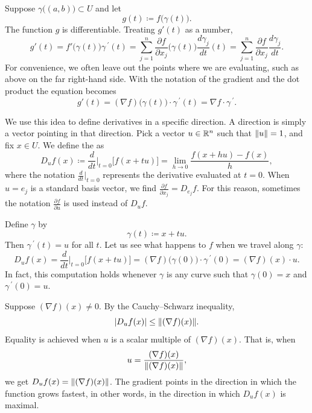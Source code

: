 Suppose $\gamma\bigl((a,b)\bigr) \subset U$ and let
\begin{equation*}
g(t) \coloneqq f\bigl(\gamma(t)\bigr) .
\end{equation*}
The function
$g$ is differentiable. Treating $g'(t)$ as a number,
\begin{equation*}
g'(t) =
f'\bigl(\gamma(t)\bigr) \gamma^{\:\prime}(t)
=
\sum_{j=1}^n
\frac{\partial f}{\partial x_j} \bigl(\gamma(t)\bigr)
\frac{d\gamma_j}{dt} (t)
=
\sum_{j=1}^n
\frac{\partial f}{\partial x_j}
\frac{d\gamma_j}{dt} .
\end{equation*}
For convenience,
we often 
leave out the points where we are evaluating,
such as above on the far right-hand side.
With the notation of the gradient and the dot product
the equation becomes
\begin{equation*}
g'(t) = (\nabla f) \bigl(\gamma(t)\bigr) \cdot \gamma^{\:\prime}(t)
= \nabla f \cdot \gamma^{\:\prime}.
\end{equation*}

We use this idea to define derivatives in a specific direction.  A direction
is simply a vector pointing in that direction.  Pick a vector $u \in {\mathbb{R}}^n$
such that $\lVert {u} \rVert = 1$, and fix $x \in U$.
We define the
\emph{} as
\begin{equation*}
D_u f (x) \coloneqq \frac{d}{dt}\Big|_{t=0} \bigl[ f(x+tu) \bigr] =
\lim_{h\to 0}
\frac{f(x+hu)-f(x)}{h} ,
\end{equation*}
where the notation
$\frac{d}{dt}\big|_{t=0}$ represents the derivative evaluated at $t=0$.
When $u=e_j$ is a standard basis vector, we find
$\frac{\partial f}{\partial x_j} = D_{e_j} f$.
For this reason, sometimes the notation $\frac{\partial f}{\partial u}$
is used instead of $D_u f$.

Define $\gamma$ by
\begin{equation*}
\gamma(t) \coloneqq x + tu .
\end{equation*}
Then $\gamma^{\:\prime}(t) = u$ for all $t$.  
Let us see what happens to $f$ when we travel along $\gamma$:
\begin{equation*}
D_u f (x) =
\frac{d}{dt}\Big|_{t=0} \bigl[ f(x+tu) \bigr] =
(\nabla f) \bigl(\gamma(0)\bigr) \cdot \gamma^{\:\prime}(0)
=
(\nabla f) (x) \cdot u .
\end{equation*}
In fact, this computation holds whenever $\gamma$ is any curve such that
$\gamma(0) = x$ and $\gamma^{\:\prime}(0) = u$.

Suppose $(\nabla f)(x) \neq 0$.
By the Cauchy--Schwarz inequality,
\begin{equation*}
\lvert {D_u f(x)} \rvert \leq \lVert {(\nabla f)(x)} \rVert .
\end{equation*}
Equality is achieved when $u$ is a scalar multiple of
$(\nabla f)(x)$.  That is, when
\begin{equation*}
u = 
\frac{(\nabla f)(x)}{\lVert {(\nabla f)(x)} \rVert} ,
\end{equation*}
we get $D_u f(x) = \lVert {(\nabla f)(x)} \rVert$.
The gradient points in the direction in which the
function grows fastest, in other words,
in the direction in which $D_u f(x)$ is maximal.

